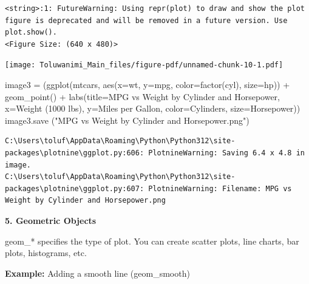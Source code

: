 \documentclass[
  letterpaper,
  DIV=11,
  numbers=noendperiod]{scrreprt}
\newenvironment{Shaded}{\begin{snugshade}}{\end{snugshade}}
\newcommand{\NormalTok}[1]{\textcolor[rgb]{0.00,0.23,0.31}{#1}}
\newcommand{\OperatorTok}[1]{\textcolor[rgb]{0.37,0.37,0.37}{#1}}
\newcommand{\StringTok}[1]{\textcolor[rgb]{0.13,0.47,0.30}{#1}}
\begin{document}
\begin{verbatim}
<string>:1: FutureWarning: Using repr(plot) to draw and show the plot figure is deprecated and will be removed in a future version. Use plot.show().
<Figure Size: (640 x 480)>
\end{verbatim}

\texttt{[image: Toluwanimi\_Main\_files/figure-pdf/unnamed-chunk-10-1.pdf]}

\begin{Shaded}
\begin{Highlighting}[]
\NormalTok{image3 }\OperatorTok{=}\NormalTok{ (ggplot(mtcars, aes(x}\OperatorTok{=}\StringTok{\textquotesingle{}wt\textquotesingle{}}\NormalTok{, y}\OperatorTok{=}\StringTok{\textquotesingle{}mpg\textquotesingle{}}\NormalTok{, color}\OperatorTok{=}\StringTok{\textquotesingle{}factor(cyl)\textquotesingle{}}\NormalTok{, size}\OperatorTok{=}\StringTok{\textquotesingle{}hp\textquotesingle{}}\NormalTok{)) }\OperatorTok{+}
\NormalTok{ geom\_point() }\OperatorTok{+}
\NormalTok{ labs(title}\OperatorTok{=}\StringTok{\textquotesingle{}MPG vs Weight by Cylinder and Horsepower\textquotesingle{}}\NormalTok{,}
\NormalTok{      x}\OperatorTok{=}\StringTok{\textquotesingle{}Weight (1000 lbs)\textquotesingle{}}\NormalTok{,}
\NormalTok{      y}\OperatorTok{=}\StringTok{\textquotesingle{}Miles per Gallon\textquotesingle{}}\NormalTok{,}
\NormalTok{      color}\OperatorTok{=}\StringTok{\textquotesingle{}Cylinders\textquotesingle{}}\NormalTok{,}
\NormalTok{      size}\OperatorTok{=}\StringTok{\textquotesingle{}Horsepower\textquotesingle{}}\NormalTok{))}
\NormalTok{image3.save (}\StringTok{"MPG vs Weight by Cylinder and Horsepower.png"}\NormalTok{)}
\end{Highlighting}
\end{Shaded}

\begin{verbatim}
C:\Users\toluf\AppData\Roaming\Python\Python312\site-packages\plotnine\ggplot.py:606: PlotnineWarning: Saving 6.4 x 4.8 in image.
C:\Users\toluf\AppData\Roaming\Python\Python312\site-packages\plotnine\ggplot.py:607: PlotnineWarning: Filename: MPG vs Weight by Cylinder and Horsepower.png
\end{verbatim}

\textbf{5. Geometric Objects}

geom\_* specifies the type of plot. You can create scatter plots, line
charts, bar plots, histograms, etc.

\textbf{Example:} Adding a smooth line (geom\_smooth)
\end{document}
